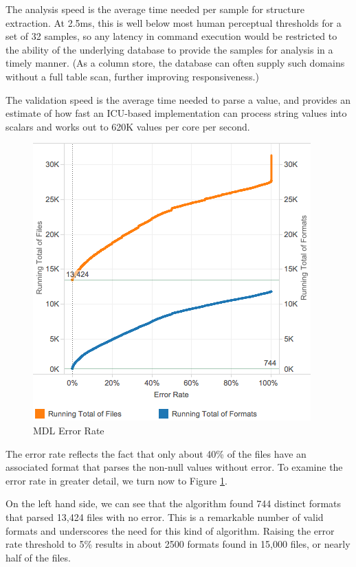 The analysis speed is the average time needed per sample for structure extraction. At 2.5ms, this is well below most human perceptual thresholds for a set of 32 samples, so any latency in command execution would be restricted to the ability of the underlying database to provide the samples for analysis in a timely manner. (As a column store, the database can often supply such domains without a full table scan, further improving responsiveness.) 

The validation speed is the average time needed to parse a value, and provides an estimate of how fast an ICU-based implementation can process string values into scalars and works out to 620K values per core per second.
 
\begin{figure}[ht]
\centering
\includegraphics[width=\columnwidth]{figures/FigureM2}
\caption{MDL Error Rate}
\label{fig:M2}
\end{figure}


The error rate reflects the fact that only about 40\% of the files have an associated format that parses the non-null values without error. To examine the error rate in greater detail, we turn now to Figure \ref{fig:M2}.

On the left hand side, we can see that the algorithm found 744 distinct formats that parsed 13,424 files with no error. This is a remarkable number of valid formats and underscores the need for this kind of algorithm. Raising the error rate threshold to 5\% results in about 2500 formats found in 15,000 files, or nearly half of the files. 

